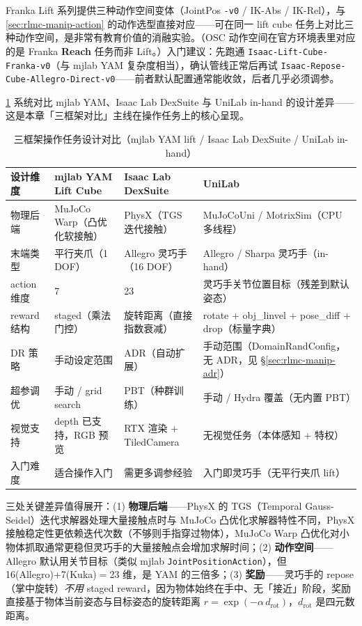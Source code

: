 Franka Lift 系列提供三种动作空间变体（JointPos \verb|-v0| / IK-Abs / IK-Rel），与 \cref{sec:rlmc-manip-action} 的动作选型直接对应——可在同一 lift cube 任务上对比三种动作空间，是非常有教育价值的消融实验。（OSC 动作空间在官方环境表里对应的是 Franka \textbf{Reach} 任务而非 Lift。）入门建议：先跑通 \verb|Isaac-Lift-Cube-Franka-v0|（与 mjlab YAM 复杂度相当），确认管线正常后再试 \verb|Isaac-Repose-Cube-Allegro-Direct-v0|——前者默认配置通常能收敛，后者几乎必须调参。

\cref{tab:rlmc-manip-frameworks} 系统对比 mjlab YAM、Isaac Lab DexSuite 与 UniLab in-hand 的设计差异——这是本章「三框架对比」主线在操作任务上的核心呈现。

\begin{table}[ht]
\centering
\small
\caption{三框架操作任务设计对比（mjlab YAM lift / Isaac Lab DexSuite / UniLab in-hand）}
\label{tab:rlmc-manip-frameworks}
\begin{tabular}{@{}llll@{}}
\toprule
设计维度 & mjlab YAM Lift Cube & Isaac Lab DexSuite & UniLab \\
\midrule
物理后端 & MuJoCo Warp（凸优化软接触） & PhysX（TGS 迭代接触） & MuJoCoUni / MotrixSim（CPU 多线程） \\
末端类型 & 平行夹爪（1 DOF） & Allegro 灵巧手（16 DOF） & Allegro / Sharpa 灵巧手（in-hand） \\
action 维度 & 7 & 23 & 灵巧手关节位置目标（残差到默认姿态） \\
reward 结构 & staged（乘法门控） & 旋转距离（直接指数衰减） & rotate + obj\_linvel + pose\_diff + drop（标量字典） \\
DR 策略 & 手动设定范围 & ADR（自动扩展） & 手动范围（DomainRandConfig，无 ADR，见 \S\ref*{sec:rlmc-manip-adr}） \\
超参调优 & 手动 / grid search & PBT（种群训练） & 手动 / Hydra 覆盖（无内置 PBT） \\
视觉支持 & depth 已支持，RGB 预览 & RTX 渲染 + TiledCamera & 无视觉任务（本体感知 + 特权） \\
入门难度 & 适合操作入门 & 需更多调参经验 & 入门即灵巧手（无平行夹爪 lift） \\
\bottomrule
\end{tabular}
\end{table}

三处关键差异值得展开：(1) \textbf{物理后端}——PhysX 的 TGS（Temporal Gauss-Seidel）迭代求解器处理大量接触点时与 MuJoCo 凸优化求解器特性不同，PhysX 接触稳定性更依赖迭代次数（不够则手指穿过物体），MuJoCo Warp 凸优化对小物体抓取通常更稳但灵巧手的大量接触点会增加求解时间；(2) \textbf{动作空间}——Allegro 默认用关节目标（类似 mjlab \verb|JointPositionAction|），但 16(Allegro)+7(Kuka)$=$23 维，是 YAM 的三倍多；(3) \textbf{奖励}——灵巧手的 repose（掌中旋转）\emph{不用} staged reward，因为物体始终在手中、无「接近」阶段，奖励直接基于物体当前姿态与目标姿态的旋转距离 $r=\exp(-\alpha\,d_{\text{rot}})$，$d_{\text{rot}}$ 是四元数距离。

